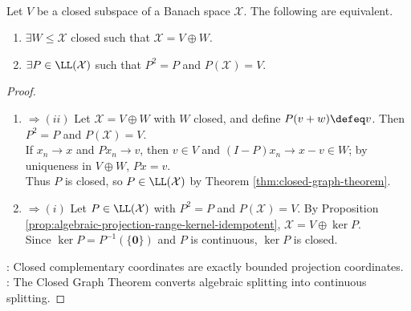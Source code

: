 \begin{theorem} \label{thm:closed-complements-continuous-projections} \\
Let $V$ be a closed subspace of a Banach space $\mathcal X$. The following are equivalent.
\begin{enumerate}[label=(\roman*)]
\setlength{\itemsep}{0pt}
\item $\exists W\leq\mathcal X$ closed such that $\mathcal X=V\oplus W$.
\item $\exists P\in\LL(\mathcal X)$ such that $P^2=P$ and $P(\mathcal X)=V$.
\end{enumerate}
\begin{proof}
\begin{enumerate}[label=\roman*.]
\setlength{\itemsep}{0pt}
\item[$(i)$]$\Rightarrow(ii)$ Let $\mathcal X=V\oplus W$ with $W$ closed, and define $P(v+w)\defeq v$. Then $P^2=P$ and $P(\mathcal X)=V$.\\
If $x_n\to x$ and $Px_n\to v$, then $v\in V$ and $(I-P)x_n\to x-v\in W$; by uniqueness in $V\oplus W$, $Px=v$.\\
Thus $P$ is closed, so $P\in\LL(\mathcal X)$ by Theorem \ref{thm:closed-graph-theorem}.
\item[$(ii)$]$\Rightarrow(i)$ Let $P\in\LL(\mathcal X)$ with $P^2=P$ and $P(\mathcal X)=V$. By Proposition \ref{prop:algebraic-projection-range-kernel-idempotent}, $\mathcal X=V\oplus\ker P$.\\
Since $\ker P=P^{-1}(\{\mathbf0\})$ and $P$ is continuous, $\ker P$ is closed.
\end{enumerate}
: Closed complementary coordinates are exactly bounded projection coordinates.\\
: The Closed Graph Theorem converts algebraic splitting into continuous splitting.
\end{proof}
\end{theorem}

